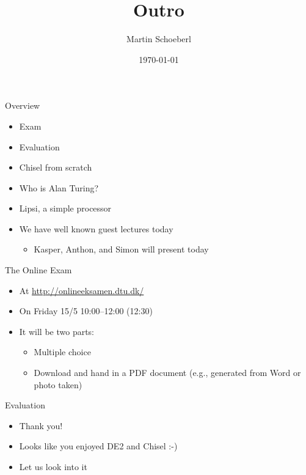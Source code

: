 

\newif\ifbook


\title{Outro}
\author{Martin Schoeberl}
\date{\today}



\begin{frame}
\titlepage
\end{frame}


\begin{frame}[fragile]{Overview}
\begin{itemize}
\item Exam
\item Evaluation
\item Chisel from scratch
\item Who is Alan Turing?
\item Lipsi, a simple processor
\item We have well known guest lectures today
\begin{itemize}
\item Kasper, Anthon, and Simon will present today
\end{itemize}
\end{itemize}
\end{frame}


\begin{frame}[fragile]{The Online Exam}
\begin{itemize}
\item At \url{http://onlineeksamen.dtu.dk/}
\item On Friday 15/5 10:00--12:00 (12:30)
\item It will be two parts:
\begin{itemize}
\item Multiple choice
\item Download and hand in a PDF document (e.g., generated from Word or photo taken)
\end{itemize}
\end{itemize}
\end{frame}


\begin{frame}[fragile]{Evaluation}
\begin{itemize}
\item Thank you!
\item Looks like you enjoyed DE2 and Chisel :-)
\item Let us look into it
\end{itemize}
\end{frame}

